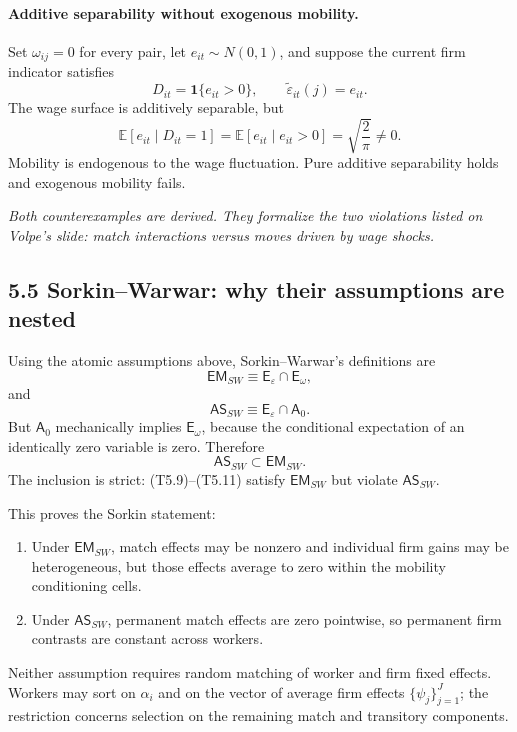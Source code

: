 \documentclass[11pt]{article}
\begin{document}
\paragraph{Additive separability without exogenous mobility.}
Set \(\omega_{ij}=0\) for every pair, let \(e_{it}\sim N(0,1)\), and suppose
the current firm indicator satisfies
\[
D_{it}=\mathbf 1\{e_{it}>0\},
\qquad
\widetilde\varepsilon_{it}(j)=e_{it}.
\tag{T5.12}
\]
The wage surface is additively separable, but
\[
\mathbb E[e_{it}\mid D_{it}=1]
=
\mathbb E[e_{it}\mid e_{it}>0]
=
\sqrt{\frac{2}{\pi}}
\neq0.
\tag{T5.13}
\]
Mobility is endogenous to the wage fluctuation.  Pure additive separability
holds and exogenous mobility fails.

\textit{Both counterexamples are derived.  They formalize the two violations
listed on Volpe's slide: match interactions versus moves driven by wage
shocks.}

\subsection{5.5 Sorkin--Warwar: why their assumptions are nested}

Using the atomic assumptions above, Sorkin--Warwar's definitions are
\[
\mathsf{EM}_{SW}
\equiv
\mathsf E_\varepsilon\cap\mathsf E_\omega,
\tag{T5.14}
\]
and
\[
\mathsf{AS}_{SW}
\equiv
\mathsf E_\varepsilon\cap\mathsf A_0.
\tag{T5.15}
\]
But \(\mathsf A_0\) mechanically implies \(\mathsf E_\omega\), because the
conditional expectation of an identically zero variable is zero.  Therefore
\[
\boxed{
\mathsf{AS}_{SW}
\subset
\mathsf{EM}_{SW}.
}
\tag{T5.16}
\]
The inclusion is strict: (T5.9)--(T5.11) satisfy
\(\mathsf{EM}_{SW}\) but violate \(\mathsf{AS}_{SW}\).

This proves the Sorkin statement:

\begin{enumerate}
\item Under \(\mathsf{EM}_{SW}\), match effects may be nonzero and individual
  firm gains may be heterogeneous, but those effects average to zero within
  the mobility conditioning cells.
\item Under \(\mathsf{AS}_{SW}\), permanent match effects are zero
  pointwise, so permanent firm contrasts are constant across workers.
\end{enumerate}

Neither assumption requires random matching of worker and firm fixed
effects.  Workers may sort on \(\alpha_i\) and on the vector of average firm
effects \(\{\psi_j\}_{j=1}^J\); the restriction concerns selection on the
remaining match and transitory components.
\end{document}
